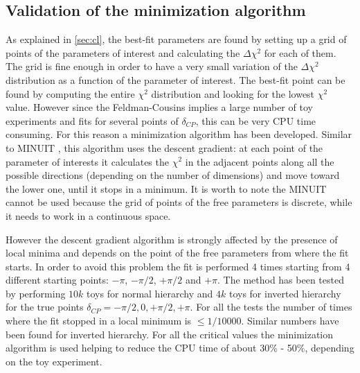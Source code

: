 %
%

\subsection{Validation of the minimization algorithm}
\label{sec:minim_algorithm}

As explained in \cref{sec:cl}, the best-fit parameters are found by setting up 
a grid of points of the parameters of interest and calculating the $\Delta \chi^2$ for each of them.
The grid is fine enough in order to have a very small variation of the $\Delta \chi^2$ distribution
as a function of the parameter of interest.
The best-fit point can be found by computing the entire $\chi^2$ distribution and 
looking for the lowest $\chi^2$ value.
However since the Feldman-Cousins implies a large number of toy experiments and fits for several points of $\delta_{CP}$,
this can be very CPU time consuming.
For this reason a minimization algorithm has been developed.
Similar to MINUIT \cite{Minuit}, this algorithm uses the descent gradient:
at each point of the parameter of interests it calculates the $\chi^2$ in the adjacent points along all the
possible directions (depending on the number of dimensions) and move toward the lower one,
until it stops in a minimum.
It is worth to note the MINUIT cannot be used because the grid of points of the free parameters is discrete,
while it needs to work in a continuous space.

However the descent gradient algorithm is strongly affected by the presence of local minima and depends on the 
point of the free parameters from where the fit starts.
In order to avoid this problem the fit is performed 4 times starting from 4 different starting points: $-\pi$, $-\pi/2$, $+\pi/2$ and $+\pi$.
The method has been tested by performing $10k$ toys for normal hierarchy and $4k$ toys for inverted hierarchy for the
true points $\delta_{CP} = -\pi/2, 0, +\pi/2, +\pi$.
For all the tests the number of times where the fit stopped in a local minimum is $\leq 1/10000$. 
Similar numbers have been found for inverted hierarchy.
For all the critical values the minimization algorithm is used helping to reduce the CPU time of about 30\% - 50\%,
depending on the toy experiment.


\clearpage

